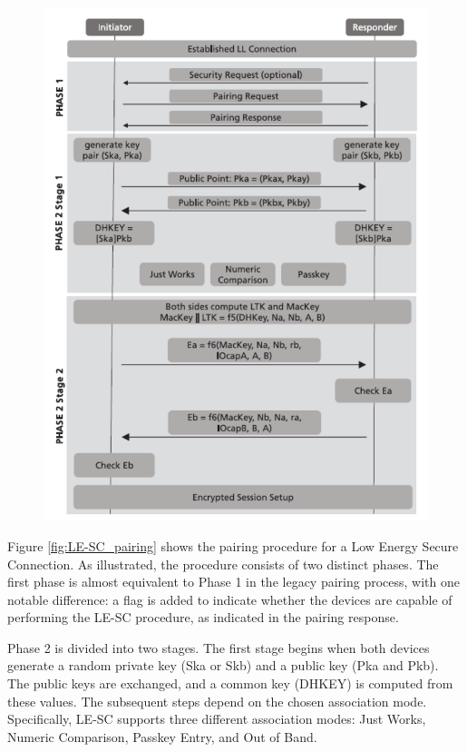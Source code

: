 \documentclass{Configuration_Files/PoliMi3i_thesis}
\begin{document}
\begin{figure}[H]
    \centering
    \includegraphics[scale=0.7]{Bluetooth_Security/5.png}
    \label{fig:pairing_procedure}
\end{figure}

Figure \ref{fig:LE-SC_pairing} shows the pairing procedure for a Low Energy Secure Connection. As illustrated, the procedure consists of two distinct phases. The first phase is almost equivalent to Phase 1 in the legacy pairing process, with one notable difference: a flag is added to indicate whether the devices are capable of performing the LE-SC procedure, as indicated in the pairing response. 

Phase 2 is divided into two stages. The first stage begins when both devices generate a random private key (Ska or Skb) and a public key (Pka and Pkb). The public keys are exchanged, and a common key (DHKEY) is computed from these values. The subsequent steps depend on the chosen association mode. Specifically, LE-SC supports three different association modes: Just Works, Numeric Comparison, Passkey Entry, and Out of Band.
\end{document}
